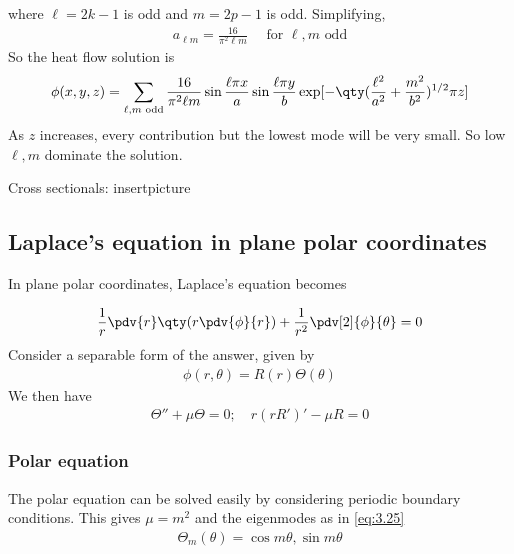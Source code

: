 \begin{example}
    where $\ell = 2k-1$ is odd and $m = 2p-1$ is odd.
    Simplifying,
    \begin{align*}
        a_{\ell m} = \frac{16}{\pi^2 \ell m} \quad \text{ for } \ell, m \text{ odd}
    \end{align*}
    So the heat flow solution is
    \begin{align*}
        \phi(x,y,z) = \sum_{\ell, m \text{ odd}} \frac{16}{\pi^2 \ell m} \sin \frac{\ell \pi x}{a} \sin \frac{\ell \pi y}{b} \exp[-\qty(\frac{\ell^2}{a^2} + \frac{m^2}{b^2})^{1/2} \pi z]
    \end{align*}
    As $z$ increases, every contribution but the lowest mode will be very small.
    So low $\ell, m$ dominate the solution.

    Cross sectionals:
    insertpicture
\end{example} 

\subsection{Laplace's equation in plane polar coordinates}
In plane polar coordinates, Laplace's equation becomes
\addtocounter{equation}{1}
\begin{align} \label{eq:5.6}
	\frac{1}{r} \pdv{r} \qty(r \pdv{\phi}{r}) + \frac{1}{r^2} \pdv[2]{\phi}{\theta} = 0
\end{align}
Consider a separable form of the answer, given by
\begin{align*}
	\phi(r,\theta) = R(r) \Theta(\theta)
\end{align*}
We then have
\begin{align*}
	\Theta'' + \mu \Theta = 0;\quad r(rR')' - \mu R = 0
\end{align*}

\subsubsection{Polar equation}
The polar equation can be solved easily by considering periodic boundary conditions.
This gives $\mu = m^2$ and the eigenmodes as in \cref{eq:3.25}
\begin{align*}
	\Theta_m(\theta) = \cos m \theta, \sin m \theta
\end{align*}

